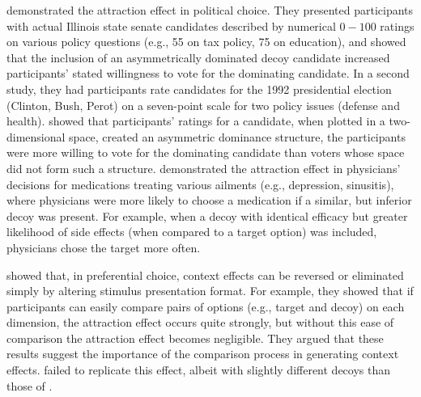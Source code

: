 \textcite{o1995attraction} demonstrated the attraction effect in political choice. They presented participants with actual Illinois state senate candidates described by numerical $0-100$ ratings on various policy questions (e.g., 55 on tax policy, 75 on education), and showed that the inclusion of an asymmetrically dominated decoy candidate increased participants' stated willingness to vote for the dominating candidate. In a second study, they had participants rate candidates for the 1992 presidential election (Clinton, Bush, Perot) on a seven-point scale for two policy issues (defense and health). \textcite{o1995attraction} showed that participants' ratings for a candidate, when plotted in a two-dimensional space, created an asymmetric dominance structure, the participants were more willing to vote for the dominating candidate than voters whose space did not form such a structure. \textcite{schwartz1999more} demonstrated the attraction effect in physicians' decisions for medications treating various ailments (e.g., depression, sinusitis), where physicians were more likely to choose a medication if a similar, but inferior decoy was present. For example, when a decoy with identical efficacy but greater likelihood of side effects (when compared to a target option) was included, physicians chose the target more often.

\textcite{cataldoComparisonProcessAccount2019b} showed that, in preferential choice, context effects can be reversed or eliminated simply by altering stimulus presentation format. For example, they showed that if participants can easily compare pairs of options (e.g., target and decoy) on each dimension, the attraction effect occurs quite strongly, but without this ease of comparison the attraction effect becomes negligible. They argued that these results suggest the importance of the comparison process in generating context effects. \textcite{hasan2025registered} failed to replicate this effect, albeit with slightly different decoys than those of \textcite{cataldoComparisonProcessAccount2019b}. 


